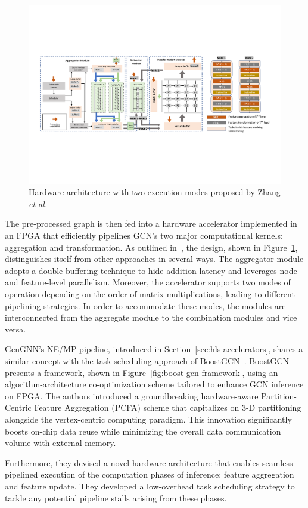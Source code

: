 \begin{figure}[t]
    \centering
    \includegraphics[height=0.26\textwidth]{Images/zhang_architecture}
    \caption{Hardware architecture with two execution modes proposed by Zhang \textit{et al.}~\cite{9153263}}
    \label{fig:zhang_architecture}
\end{figure}

The pre-processed graph is then fed into a hardware accelerator implemented in an FPGA that efficiently pipelines GCN's two major computational kernels: aggregation and transformation.
As outlined in~\cite{DBLP:journals/corr/abs-2010-00130}, the design, shown in Figure~\ref{fig:zhang_architecture}, distinguishes itself from other approaches in several ways.
The aggregator module adopts a double-buffering technique to hide addition latency and leverages node- and feature-level parallelism.
Moreover, the accelerator supports two modes of operation depending on the order of matrix multiplications, leading to different pipelining strategies.
In order to accommodate these modes, the modules are interconnected from the aggregate module to the combination modules and vice versa.

GenGNN's NE/MP pipeline, introduced in Section~\ref{sec:hls-accelerators}, shares a similar concept with the task scheduling approach of BoostGCN~\cite{9444065}.
BoostGCN presents a framework, shown in Figure~\ref{fig:boost-gcn-framework}, using an algorithm-architecture co-optimization scheme tailored to enhance GCN inference on FPGA.
The authors introduced a groundbreaking hardware-aware Partition-Centric Feature Aggregation (PCFA) scheme that capitalizes on 3-D partitioning alongside the vertex-centric computing paradigm.
This innovation significantly boosts on-chip data reuse while minimizing the overall data communication volume with external memory.

Furthermore, they devised a novel hardware architecture that enables seamless pipelined execution of the computation phases of inference: feature aggregation and feature update.
They developed a low-overhead task scheduling strategy to tackle any potential pipeline stalls arising from these phases.

